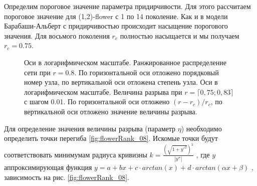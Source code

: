 \documentclass[10pt,aps,pra]{revtex4-1}
\begin{document}
        Определим пороговое значение параметра придирчивости. Для этого рассчитаем пороговое значение для (1,2)-flower с 1 по 14 поколение. Как и в модели Барабаши-Альберт с придирчивостью происходит насыщение порогового значения. Для восьмого поколения $r_c$ полностью насыщается и мы получаем $r_c=0.75$. 

            \begin{figure}[H]  
                \centering

                \caption{
                    \label{fig:flowerRank}
                     Оси в логарифмическом масштабе. Ранжированное распределение сети при $r=0.8$. По горизонтальной оси отложено порядковый номер узла, по вертикальной оси отложена степень узла.
                     Оси в логарифмическом масштабе. Величина разрыва при $r=\lceil 0,75; 0,83 \rceil$ с шагом 0.01. По горизонтальной оси отложено $(r-r_c)/r_c$, по вертикальной оси отложено значение величины разрыва.
                }
            \end{figure}

        Для определение значения величины разрыва (параметр $\eta$) необходимо определить точки перегиба \ref{fig:flowerRank_08}. Искомые точки будут соответствовать минимумам радиуса кривизны $k=\frac{(\sqrt{1+y'^2})^3}{|y''|}$ \cite{Hazewinkel}, где $y$ аппроксимирующая функция $y=a+bx+c \cdot arctan(x) + d \cdot arctan(\alpha x + \beta)$ \cite{Mills}, зависимость на рис. \ref{fig:flowerRank_08}.
\end{document}
